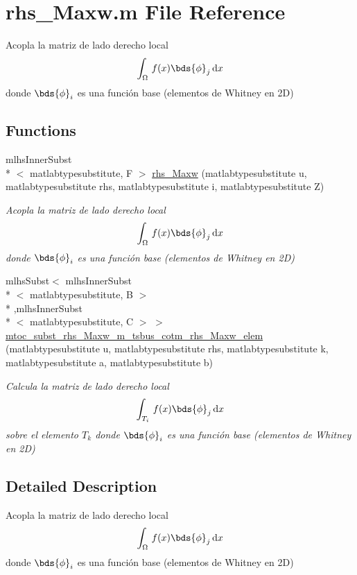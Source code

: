 \hypertarget{a00030}{\section{rhs\-\_\-\-Maxw.\-m File Reference}
\label{a00030}
}


Acopla la matriz de lado derecho local \[ \int_{\Omega}\,f(x) \bds{\phi}_j \, \mathrm{d}x \] donde $ \bds{\phi}_i $ es una función base (elementos de Whitney en 2\-D)  


\subsection*{Functions}
\begin{DoxyCompactItemize}
\item 
mlhs\-Inner\-Subst\\*
$<$ matlabtypesubstitute, F $>$ \hyperlink{a00030_a0611963c1c76c278859f84cefa8df08f}{rhs\-\_\-\-Maxw} (matlabtypesubstitute u, matlabtypesubstitute rhs, matlabtypesubstitute i, matlabtypesubstitute Z)
\begin{DoxyCompactList}\small\item\em Acopla la matriz de lado derecho local \[ \int_{\Omega}\,f(x) \bds{\phi}_j \, \mathrm{d}x \] donde $ \bds{\phi}_i $ es una función base (elementos de Whitney en 2\-D) \end{DoxyCompactList}\item 
mlhs\-Subst$<$ mlhs\-Inner\-Subst\\*
$<$ matlabtypesubstitute, B $>$\\*
,mlhs\-Inner\-Subst\\*
$<$ matlabtypesubstitute, C $>$ $>$ \hyperlink{a00030_a2848e8dd44d0e32a463abc0fd98e5d85}{mtoc\-\_\-subst\-\_\-rhs\-\_\-\-Maxw\-\_\-m\-\_\-tsbus\-\_\-cotm\-\_\-rhs\-\_\-\-Maxw\-\_\-elem} (matlabtypesubstitute u, matlabtypesubstitute rhs, matlabtypesubstitute k, matlabtypesubstitute a, matlabtypesubstitute b)
\begin{DoxyCompactList}\small\item\em Calcula la matriz de lado derecho local \[ \int_{T_i}\,f(x) \bds{\phi}_j \, \mathrm{d}x \] sobre el elemento $ T_k $ donde $ \bds{\phi}_i $ es una función base (elementos de Whitney en 2\-D) \end{DoxyCompactList}\end{DoxyCompactItemize}


\subsection{Detailed Description}
Acopla la matriz de lado derecho local \[ \int_{\Omega}\,f(x) \bds{\phi}_j \, \mathrm{d}x \] donde $ \bds{\phi}_i $ es una función base (elementos de Whitney en 2\-D) 

